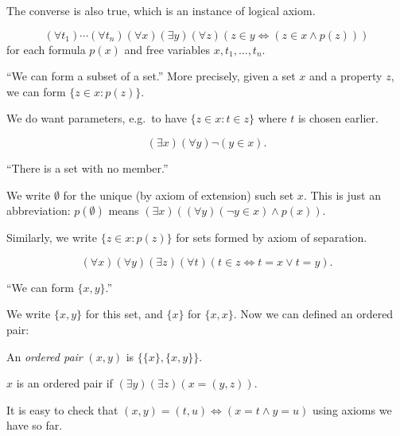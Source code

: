 \documentclass[a4paper]{article}
\begin{document}
\begin{note}
  The converse is also true, which is an instance of logical axiom.
\end{note}

\begin{axiom*}
  \[
    (\forall t_1) \cdots (\forall t_n) (\forall x) (\exists y) (\forall z) (z \in y \iff (z \in x \land p(z)))
  \]
  for each formula \(p(x)\) and free variables \(x, t_1, \dots, t_n\).
\end{axiom*}
``We can form a subset of a set.'' More precisely, given a set \(x\) and a property \(z\), we can form \(\{z \in x: p(z)\}\).

\begin{note}
  We do want parameters, e.g.\ to have \(\{z \in x: t \in z\}\) where \(t\) is chosen earlier.
\end{note}

\begin{axiom*}
  \[
    (\exists x) (\forall y) \neg (y \in x).
  \]
\end{axiom*}
``There is a set with no member.''

We write \(\emptyset\) for the unique (by axiom of extension) such set \(x\). This is just an abbreviation: \(p(\emptyset)\) means \((\exists x) ((\forall y) (\neg y \in x) \land p(x))\).

Similarly, we write \(\{z \in x: p(z)\}\) for sets formed by axiom of separation.

\begin{axiom*}
  \[
    (\forall x) (\forall y) (\exists z) (\forall t) (t \in z \iff t = x \lor t = y).
  \]
\end{axiom*}
``We can form \(\{x, y\}\).''

We write \(\{x, y\}\) for this set, and \(\{x\}\) for \(\{x, x\}\). Now we can defined an ordered pair:

\begin{definition}
  An \emph{ordered pair} \((x, y)\) is \(\{\{x\}, \{x, y\}\}\).

  \(x\) is an ordered pair if \((\exists y) (\exists z) (x = (y, z))\).
\end{definition}

It is easy to check that \((x, y) = (t, u) \iff (x = t \land y = u)\) using axioms we have so far.
\end{document}
